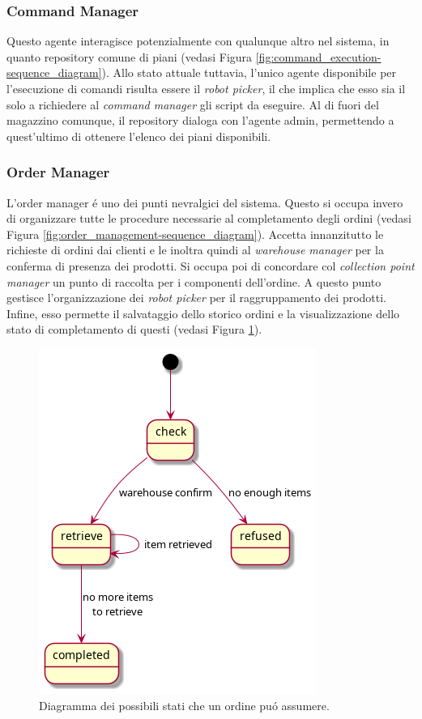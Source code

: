 \subsubsection{Command Manager}
Questo agente interagisce potenzialmente con qualunque altro nel sistema, in quanto repository comune di piani (vedasi Figura \ref{fig:command_execution-sequence_diagram}). Allo stato attuale tuttavia, l'unico agente disponibile per l'esecuzione di comandi risulta essere il \textit{robot picker}, il che implica che esso sia il solo a richiedere al \textit{command manager} gli script da eseguire. Al di fuori del magazzino comunque, il repository dialoga con l'agente admin, permettendo a quest'ultimo di ottenere l'elenco dei piani disponibili.

\subsubsection{Order Manager}
L'order manager \'e uno dei punti nevralgici del sistema. Questo si occupa invero di organizzare tutte le procedure necessarie al completamento degli ordini (vedasi Figura \ref{fig:order_management-sequence_diagram}). Accetta innanzitutto le richieste di ordini dai clienti e le inoltra quindi al \textit{warehouse manager} per la conferma di presenza dei prodotti. Si occupa poi di concordare col \textit{collection point manager} un punto di raccolta per i componenti dell'ordine. A questo punto gestisce l'organizzazione dei \textit{robot picker} per il raggruppamento dei prodotti. Infine, esso permette il salvataggio dello storico ordini e la visualizzazione dello stato di completamento di questi (vedasi Figura \ref{fig:order-state_diagram}).
\begin{figure}[!ht]\centering
    \includegraphics[width=.75\textwidth]{section/design/figure/order-state_diagram.png}
    \caption{Diagramma dei possibili stati che un ordine pu\'o assumere.}%
    \label{fig:order-state_diagram}
\end{figure}

